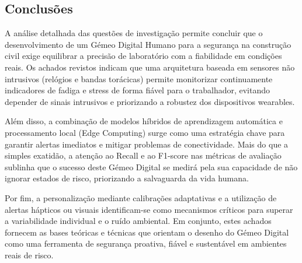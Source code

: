 \subsection{Conclusões}
\label{subsec:conclusiones}

A análise detalhada das questões de investigação permite concluir que o desenvolvimento de um Gémeo Digital Humano para a segurança na construção civil exige equilibrar a precisão de laboratório com a fiabilidade em condições reais. Os achados revistos indicam que uma arquitetura baseada em sensores não intrusivos (relógios e bandas torácicas) permite monitorizar continuamente indicadores de fadiga e stress de forma fiável para o trabalhador, evitando depender de sinais intrusivos e priorizando a robustez dos dispositivos wearables.

Além disso, a combinação de modelos híbridos de aprendizagem automática e processamento local (Edge Computing) surge como uma estratégia chave para garantir alertas imediatos e mitigar problemas de conectividade. Mais do que a simples exatidão, a atenção ao Recall e ao F1-score nas métricas de avaliação sublinha que o sucesso deste Gémeo Digital se medirá pela sua capacidade de não ignorar estados de risco, priorizando a salvaguarda da vida humana.

Por fim, a personalização mediante calibrações adaptativas e a utilização de alertas hápticos ou visuais identificam-se como mecanismos críticos para superar a variabilidade individual e o ruído ambiental. Em conjunto, estes achados fornecem as bases teóricas e técnicas que orientam o desenho do Gémeo Digital como uma ferramenta de segurança proativa, fiável e sustentável em ambientes reais de risco.